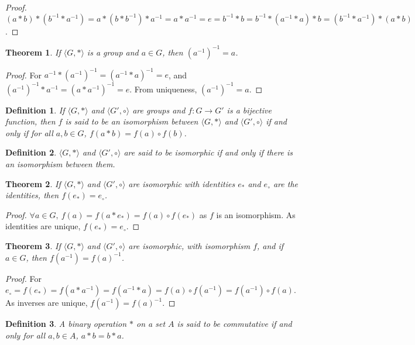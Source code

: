 \documentclass[crop=false,class=book]{standalone}
\theoremstyle{mystyle}
\newtheorem{theorem}{Theorem}[section]
\newtheorem{definition}{Definition}[section]
\begin{document}
\begin{proof}
$(a*b)*(b^{-1}*a^{-1}) = a*(b*b^{-1})*a^{-1} = a*a^{-1} = e=b^{-1}*b=b^{-1}*(a^{-1}*a)*b=(b^{-1}*a^{-1})*(a*b)  $.
\end{proof}
\begin{theorem}
If $\langle G,* \rangle$ is a group and $a\in G$, then $(a^{-1})^{-1} = a$.
\end{theorem}
\begin{proof}
For $a^{-1}*(a^{-1})^{-1} = (a^{-1}* a)^{-1} = e$, and $(a^{-1})^{-1}*a^{-1} = (a*a^{-1})^{-1} = e$. From uniqueness, $(a^{-1})^{-1} = a$.
\end{proof}
\begin{definition}
If $\langle G, * \rangle$ and $\langle G',\circ \rangle$ are groups and $f:G\rightarrow G'$ is a bijective function, then $f$ is said to be an isomorphism between $\langle G, * \rangle$ and $\langle G',\circ \rangle$ if and only if for all $a,b\in G$, $f(a*b) =f(a)\circ f(b)$.
\end{definition}
\begin{definition}
$\langle G, *\rangle$ and $\langle G', \circ \rangle$ are said to be isomorphic if and only if there is an isomorphism between them.
\end{definition}
\begin{theorem}
If $\langle G, * \rangle$ and $\langle G', \circ \rangle$ are isomorphic with identities $e_*$ and $e_{\circ}$ are the identities, then $f(e_*) = e_{\circ}$.
\end{theorem}
\begin{proof}
$\forall a\in G,\ f(a)=f(a* e_*) = f(a)\circ f(e_*)$ as $f$ is an isomorphism. As identities are unique, $f(e_*) = e_{\circ}$.
\end{proof}
\begin{theorem}
If $\langle G, * \rangle$ and $\langle G', \circ \rangle$ are isomorphic, with isomorphism $f$, and if $a\in G$, then $f(a^{-1}) = f(a)^{-1}$.
\end{theorem}
\begin{proof}
For $e_{\circ}=f(e_*) = f(a*a^{-1}) = f(a^{-1}*a) = f(a)\circ f(a^{-1})=f(a^{-1})\circ f(a)$. As inverses are unique, $f(a^{-1})=f(a)^{-1}$.
\end{proof}
\begin{definition}
A binary operation $*$ on a set $A$ is said to be commutative if and only for all $a,b\in A$, $a*b = b*a$.
\end{definition}
\end{document}
